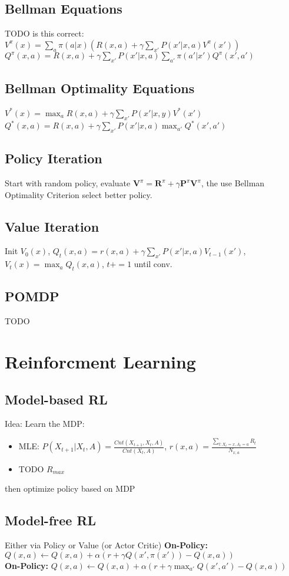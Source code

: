 \documentclass[11pt]{article}
\begin{document}
\begin{multicols*}{3}
\subsection*{Bellman Equations} TODO is this correct:
$V^\pi(x) = \sum_a \pi(a|x) (R(x,a) + \gamma \sum_{x'} P(x'|x,a) V^\pi (x'))$\\
$Q^\pi(x,a) = R(x,a) + \gamma \sum_{x'} P(x'|x,a) \sum_{a'} \pi(a'|x')Q^\pi(x',a')$
\subsection*{Bellman Optimality Equations}
$V^*(x) = \max_a R(x,a) + \gamma \sum_{x'} P(x' | x,y) V^*(x')$\\
$Q^*(x,a) = R(x,a) + \gamma \sum_{x'}P(x'|x,a) \max_{a'} Q^*(x',a')$
\subsection*{Policy Iteration}
Start with random policy, evaluate $\mathbf{V}^\pi = \mathbf{R}^\pi + \gamma \mathbf{P}^\pi \mathbf{V}^\pi$, the use Bellman Optimality Criterion select better policy.
\subsection*{Value Iteration}
Init $V_0(x)$, $Q_t(x,a) = r(x,a) + \gamma \sum_{x'} P(x'|x,a)V_{t-1}(x')$, $V_t(x) = \max_a Q_t (x,a)$, $t+=1$ until conv.
\subsection*{POMDP}
TODO

\section*{Reinforcment Learning}
\subsection*{Model-based RL}
Idea: Learn the MDP:
\begin{itemize}
	\item MLE: $P(X_{t+1}|X_t,A) = \frac{Cnt(X_{t+1},X_t,A)}{Cnt(X_t,A)}$, $r(x,a)=\frac{\sum_{t:X_t=x,A_t=a} R_t }{N_{x,a}}$
	\item TODO $R_{max}$
\end{itemize}

then optimize policy based on MDP



\subsection*{Model-free RL}
Either via Policy or Value (or Actor Critic)
\textbf{On-Policy:} $Q(x,a) \leftarrow Q(x,a) + \alpha (r + \gamma Q(x',\pi(x')) -Q(x,a) )$\\
\textbf{On-Policy:} $Q(x,a) \leftarrow Q(x,a) + \alpha (r + \gamma \max_{a'} Q(x',a') - Q(x,a) )$


\end{multicols*}
\end{document}
